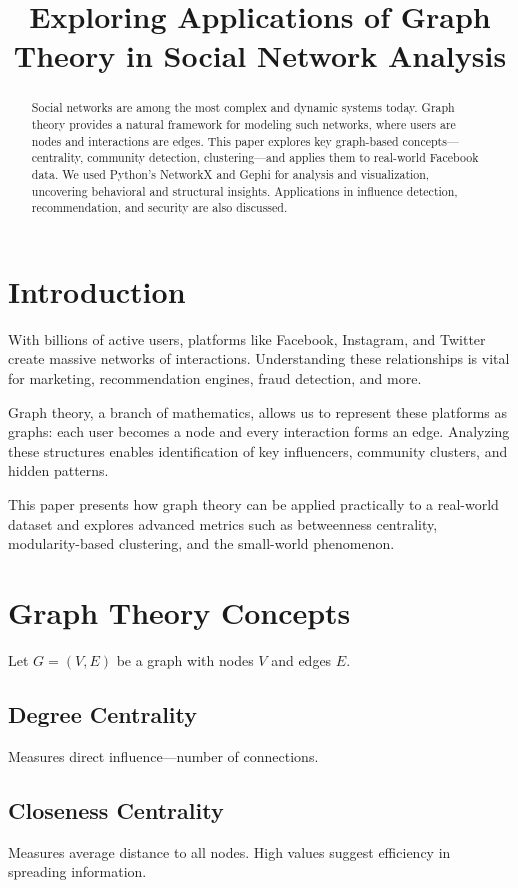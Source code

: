 \documentclass[conference]{IEEEtran}
\title{\LARGE \bf Exploring Applications of Graph Theory in Social Network Analysis}
\author{
    \IEEEauthorblockN{Gunjan Kumari}
    \IEEEauthorblockA{
        B.Sc (Hons.) Mathematics \\
        Shaheed Rajguru College of Applied Sciences for Women \\
        University of Delhi \\
        \href{mailto:gunjankumari1096@gmail.com}{gunjankumari1096@gmail.com}
    }
}
\begin{document}
\maketitle

\begin{abstract}
Social networks are among the most complex and dynamic systems today. Graph theory provides a natural framework for modeling such networks, where users are nodes and interactions are edges. This paper explores key graph-based concepts—centrality, community detection, clustering—and applies them to real-world Facebook data. We used Python's NetworkX and Gephi for analysis and visualization, uncovering behavioral and structural insights. Applications in influence detection, recommendation, and security are also discussed.
\end{abstract}

\section{Introduction}
With billions of active users, platforms like Facebook, Instagram, and Twitter create massive networks of interactions. Understanding these relationships is vital for marketing, recommendation engines, fraud detection, and more.

Graph theory, a branch of mathematics, allows us to represent these platforms as graphs: each user becomes a node and every interaction forms an edge. Analyzing these structures enables identification of key influencers, community clusters, and hidden patterns.

This paper presents how graph theory can be applied practically to a real-world dataset and explores advanced metrics such as betweenness centrality, modularity-based clustering, and the small-world phenomenon.

\section{Graph Theory Concepts}
Let \( G = (V, E) \) be a graph with nodes \( V \) and edges \( E \).

\subsection{Degree Centrality}
Measures direct influence—number of connections.

\subsection{Closeness Centrality}
Measures average distance to all nodes. High values suggest efficiency in spreading information.
\end{document}
